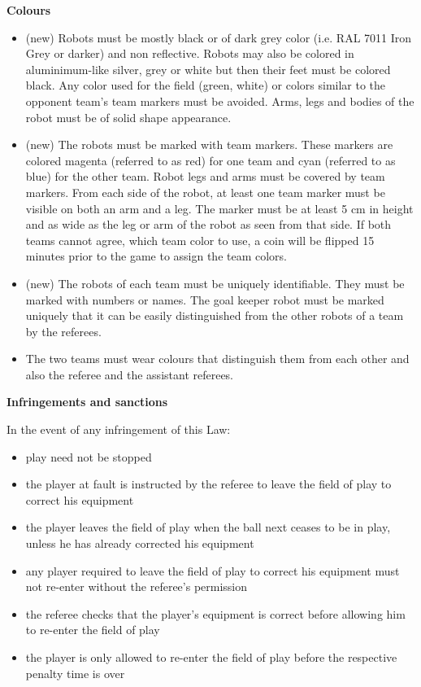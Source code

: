 \bigskip

{\bfseries Colours}

\headlinebox

\begin{itemize}
\item (new) Robots must be mostly black or of dark grey color (i.e. RAL 7011 Iron Grey or darker) and non reflective. Robots may also be colored in aluminimum-like silver, grey or white but then their feet must be colored black. Any color used for the field (green, white) or colors similar to the opponent team's team markers must be avoided. Arms, legs and bodies of the robot must be of solid shape appearance.
\item (new) The robots must be marked with team markers. These markers are colored magenta (referred to as red) for one team and cyan (referred to as blue) for the other team. Robot legs and arms must be covered by team markers. From each side of the robot, at least one team marker must be visible on both an arm and a leg. The marker must be at least 5 cm in height and as wide as the leg or arm of the robot as seen from that side. If both teams cannot agree, which team color to use, a coin will be flipped 15 minutes prior to the game to assign the team colors.
\item (new) The robots of each team must be uniquely identifiable. They must be marked with numbers or names. The goal keeper robot must be marked uniquely that it can be easily distinguished from the other robots of a team by the referees. 
\item The two teams must wear colours that distinguish them from each other and also the referee and the assistant referees.
\end{itemize}

\bigskip

{\bfseries Infringements and sanctions}

\headlinebox

In the event of any infringement of this Law:

\begin{itemize}
\item play need not be stopped
\item the player at fault is instructed by the referee to leave the field of play to correct his equipment
\item the player leaves the field of play when the ball next ceases to be in play, unless he has already corrected his equipment
\item any player required to leave the field of play to correct his equipment must not re-enter without the referee's permission
\item the referee checks that the player's equipment is correct before allowing him to re-enter the field of play 
\item the player is only allowed to re-enter the field of play before the respective penalty time is over 
\end{itemize}


